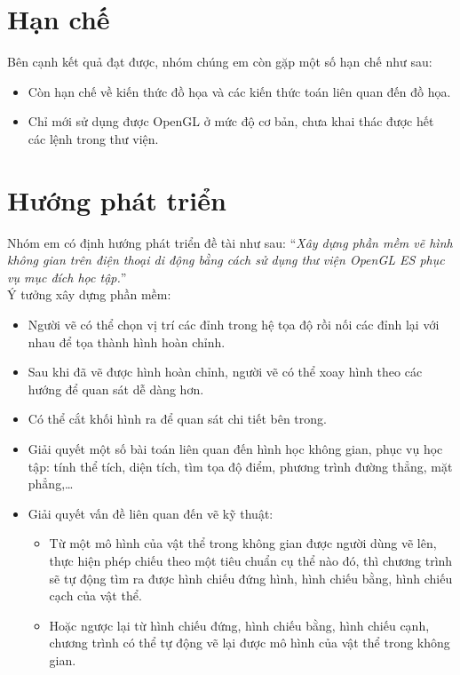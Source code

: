 \documentclass[13pt,a4paper]{extreport}
\begin{document}
\section{Hạn chế}
	Bên cạnh kết quả đạt được, nhóm chúng em còn gặp một số hạn chế như sau:
		\begin{itemize}
			\item Còn hạn chế về kiến thức đồ họa và các kiến thức toán liên quan đến đồ họa.
			
			\item Chỉ mới sử dụng được OpenGL ở mức độ cơ bản, chưa khai thác được hết các lệnh trong thư viện.		
		\end{itemize}
\section{Hướng phát triển}
Nhóm em có định hướng phát triển đề tài như sau: ``\emph{Xây dựng phần mềm vẽ hình không gian trên điện thoại di động bằng cách sử dụng thư viện OpenGL ES phục vụ mục đích học tập.}''\\

	Ý tưởng xây dựng phần mềm:
	\begin{itemize}
		\item Người vẽ có thể chọn vị trí các đỉnh trong hệ tọa độ rồi nối các đỉnh lại với nhau để tọa thành hình hoàn chỉnh.
		
		\item Sau khi đã vẽ được hình hoàn chỉnh, người vẽ có thể xoay hình theo các hướng để quan sát dễ dàng hơn.	
		
		\item Có thể cắt khối hình ra để quan sát chi tiết bên trong.
		
		\item Giải quyết một số bài toán liên quan đến hình học không gian, phục vụ học tập: tính thể tích, diện tích, tìm tọa độ điểm, phương trình đường thẳng, mặt phẳng,\ldots
		
		\item Giải quyết vấn đề liên quan đến vẽ kỹ thuật:
			\begin{itemize}
				\item Từ một mô hình của vật thể trong không gian được người dùng vẽ lên, thực hiện phép chiếu theo một tiêu chuẩn cụ thể nào đó, thì chương trình sẽ tự động tìm ra được hình chiếu đứng hình, hình chiếu bằng, hình chiếu cạch của vật thể. 
				\item Hoặc ngược lại từ hình chiếu đứng, hình chiếu bằng, hình chiếu cạnh, chương trình có thể tự động vẽ lại được mô hình của vật thể trong không gian.
			\end{itemize}				
	\end{itemize}
\end{document}
